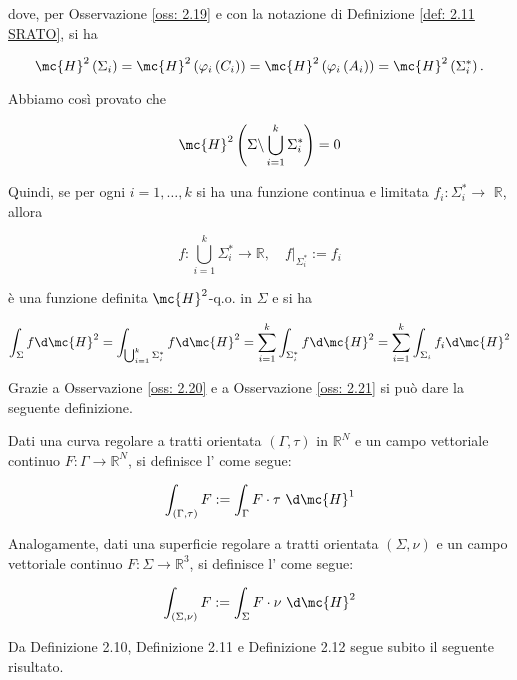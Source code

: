\begin{oss}
\begin{itemize}
dove, per Osservazione \ref{oss: 2.19} e con la notazione di Definizione \ref{def: 2.11 SRATO}, si ha

\[
\mc{H}^{2}\left(\Sigma_{i}\right)=\mc{H}^{2}\left(\varphi_{i}\left(C_{i}\right)\right)=\mc{H}^{2}\left(\varphi_{i}\left(A_{i}\right)\right)=\mc{H}^{2}\left(\Sigma_{i}^{*}\right) .
\]

Abbiamo così provato che

\[
\mc{H}^{2}\left(\Sigma \backslash \bigcup_{i=1}^{k} \Sigma_{i}^{*}\right)=0
\]

Quindi, se per ogni $i=1, \ldots, k$ si ha una funzione continua e limitata $f_{i}: \Sigma_{i}^{*} \rightarrow$ $\mathbb{R}$, allora

\[
f: \bigcup_{i=1}^{k} \Sigma_{i}^{*} \rightarrow \mathbb{R},\left.\quad f\right|_{\Sigma_{i}^{*}}:=f_{i}
\]

è una funzione definita $\mc{H}^{2}$-q.o. in $\Sigma$ e si ha

\[
\int_{\Sigma} f \d \mc{H}^{2}=\int_{\bigcup_{i=1}^{k} \Sigma_{i}^{*}} f \d \mc{H}^{2}=\sum_{i=1}^{k} \int_{\Sigma_{i}^{*}} f \d \mc{H}^{2}=\sum_{i=1}^{k} \int_{\Sigma_{i}} f_{i} \d \mc{H}^{2}
\]
\end{itemize}
\end{oss}

Grazie a Osservazione \ref{oss: 2.20} e a Osservazione \ref{oss: 2.21} si può dare la seguente definizione.

\begin{boxdef}
Dati una curva regolare a tratti orientata $(\Gamma, \tau)$ in $\mathbb{R}^{N}$ e un campo vettoriale continuo $F: \Gamma \rightarrow \mathbb{R}^{N}$, si definisce l'  come segue:

\[
\int_{(\Gamma, \tau)} F:=\int_{\Gamma} F \cdot \tau\ \d \mc{H}^{1}
\]

Analogamente, dati una superficie regolare a tratti orientata $(\Sigma, \nu)$ e un campo vettoriale continuo $F: \Sigma \rightarrow \mathbb{R}^{3}$, si definisce l'  come segue:

\[
\int_{(\Sigma, \nu)} F:=\int_{\Sigma} F \cdot \nu\ \d \mc{H}^{2}
\]
\end{boxdef}

Da Definizione 2.10, Definizione 2.11 e Definizione 2.12 segue subito il seguente risultato.

